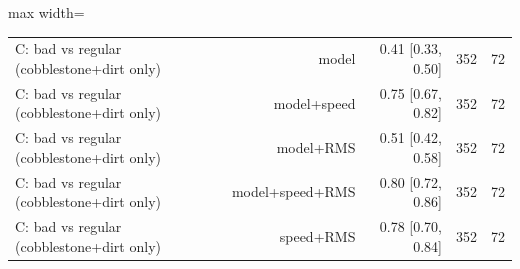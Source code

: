 \begin{table}[!htbp]
\begin{adjustbox}{max width=\columnwidth}
\begin{tabular}{lrrrr}
C: bad vs regular (cobblestone+dirt only) & model & 0.41 [0.33, 0.50] & 352 & 72 \\
C: bad vs regular (cobblestone+dirt only) & model+speed & 0.75 [0.67, 0.82] & 352 & 72 \\
C: bad vs regular (cobblestone+dirt only) & model+RMS & 0.51 [0.42, 0.58] & 352 & 72 \\
C: bad vs regular (cobblestone+dirt only) & model+speed+RMS & 0.80 [0.72, 0.86] & 352 & 72 \\
C: bad vs regular (cobblestone+dirt only) & speed+RMS & 0.78 [0.70, 0.84] & 352 & 72 \\
\bottomrule
\end{tabular}
\end{adjustbox}
\end{table}
